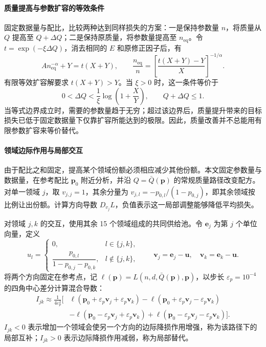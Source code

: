 \documentclass[bwprint]{gmcmthesis}
\numberwithin{equation}{section}
\numberwithin{figure}{section}
\numberwithin{table}{section}
\begin{document}
        \paragraph{质量提高与参数扩容的等效条件}
        固定数据量与配比，比较两种达到同样损失的方案：一是保持参数量 $n$，将质量从 $Q$ 提高至 $Q+\Delta Q$；二是保持原质量，将参数量提高至 $n_{\mathrm{eq}}$。令 $t=\exp(-\xi\Delta Q)$，消去相同的 $E$ 和原修正因子后，有
        \begin{equation}
         A n_{\mathrm{eq}}^{-\alpha}+Y=t(X+Y),\qquad
         \frac{n_{\mathrm{eq}}}{n}=\left[\frac{t(X+Y)-Y}{X}\right]^{-1/\alpha}.
         \label{eq:p2_equiv}
        \end{equation}
        有限等效扩容解要求 $t(X+Y)>Y$。当 $\xi>0$ 时，这一条件等价于
        \begin{equation}
         0<\Delta Q<\frac1\xi\log\left(1+\frac XY\right),\qquad Q+\Delta Q\leq1.
         \label{eq:p2_equiv_bound}
        \end{equation}
        当等式边界成立时，需要的参数量趋于无穷；超过该边界后，质量提升带来的目标损失已低于固定数据量下仅靠扩容所能达到的极限。因此，质量改善并不总能用有限参数扩容来等价替代。
    
        \paragraph{领域边际作用与局部交互}
        由于配比之和固定，提高某个领域份额必须相应减少其他份额。本文固定参数量与数据量，在参考配比 $\bm p_0$ 附近分析，并沿 $Q=\bar Q(\bm p)$ 的常规质量路径改变配方。对单一领域 $j$，取 $v_{j,j}=1$，其余分量为 $v_{j,l}=-p_{0,l}/(1-p_{0,j})$，即其余领域按比例让出份额。计算方向导数 $D_{v_j}L$，负值表示这一局部调整能够降低平均损失。
        
        对领域 $j,k$ 的交互，使用其余 15 个领域组成的共同供给池。令 $\bm e_j$ 为第 $j$ 个单位向量，定义
        \begin{equation}
         u_l=\begin{cases}0,&l\in\{j,k\},\\
         \dfrac{p_{0,l}}{1-p_{0,j}-p_{0,k}},&l\notin\{j,k\},\end{cases}
         \qquad \bm v_j=\bm e_j-\bm u,\quad \bm v_k=\bm e_k-\bm u.
         \label{eq:p2_pool}
        \end{equation}
        将两个方向固定在参考点，记 $\ell(\bm p)=L(n,d,\bar Q(\bm p),\bm p)$，以步长 $\varepsilon_p=10^{-4}$ 的四角中心差分计算混合导数：
        \begin{equation}
         \begin{aligned}
         I_{jk}\approx\frac1{4\varepsilon_p^2}\big[&\ell(\bm p_0+\varepsilon_p\bm v_j+\varepsilon_p\bm v_k)
         -\ell(\bm p_0+\varepsilon_p\bm v_j-\varepsilon_p\bm v_k)\\
         &-\ell(\bm p_0-\varepsilon_p\bm v_j+\varepsilon_p\bm v_k)
         +\ell(\bm p_0-\varepsilon_p\bm v_j-\varepsilon_p\bm v_k)\big].
         \end{aligned}
         \label{eq:p2_interaction}
        \end{equation}
        $I_{jk}<0$ 表示增加一个领域会使另一个方向的边际降损作用增强，称为该路径下的局部互补；$I_{jk}>0$ 表示边际降损作用减弱，称为局部替代。
\end{document}
